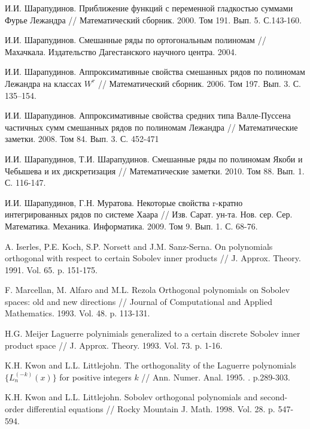 \begin{thebibliography}{1} %

 И.И. Шарапудинов. Приближение функций с переменной гладкостью суммами Фурье Лежандра // Математический сборник. 2000. Том 191. Вып. 5. С.143-160.

 И.И. Шарапудинов. Смешанные ряды по ортогональным полиномам // Махачкала. Издательство Дагестанского научного центра. 2004.

 И.И. Шарапудинов. Аппроксимативные свойства смешанных рядов по полиномам Лежандра на классах $W^r$ // Математический сборник. 2006. Том 197. Вып. 3. С. 135–154.

 И.И. Шарапудинов. Аппроксимативные свойства средних типа Валле-Пуссена частичных сумм смешанных рядов по полиномам Лежандра // Математические заметки. 2008. Том 84. Вып. 3. С. 452-471

 И.И. Шарапудинов, Т.И. Шарапудинов. Смешанные ряды по полиномам Якоби и Чебышева и их дискретизация // Математические заметки. 2010. Том 88. Вып. 1. С. 116-147.

 И.И. Шарапудинов,  Г.Н. Муратова. Некоторые свойства r-кратно интегрированных рядов по системе Хаара // Изв. Сарат. ун-та. Нов. сер. Сер. Математика. Механика. Информатика. 2009. Том 9. Вып. 1. С. 68-76.

 A. Iserles, P.E. Koch, S.P. Norsett and J.M. Sanz-Serna. On polynomials  orthogonal  with respect  to certain Sobolev inner products // J. Approx. Theory. 1991. Vol. 65. p. 151-175.

 F. Marcellan, M. Alfaro and M.L. Rezola Orthogonal polynomials on Sobolev spaces: old and new directions // Journal of Computational and Applied Mathematics. 1993. Vol. 48. p. 113-131.

 H.G. Meijer Laguerre polynimials generalized to a certain discrete Sobolev inner product space // J. Approx. Theory. 1993. Vol. 73. p. 1-16.

 K.H. Kwon and L.L. Littlejohn. The orthogonality of the Laguerre polynomials $\{L_n^{(-k)}(x)\}$ for positive integers $k$ // Ann. Numer. Anal. 1995. . p.289-303.

 K.H. Kwon and L.L. Littlejohn. Sobolev orthogonal polynomials and second-order differential equations // Rocky Mountain J. Math. 1998. Vol. 28. p. 547-594.


\end{thebibliography}
